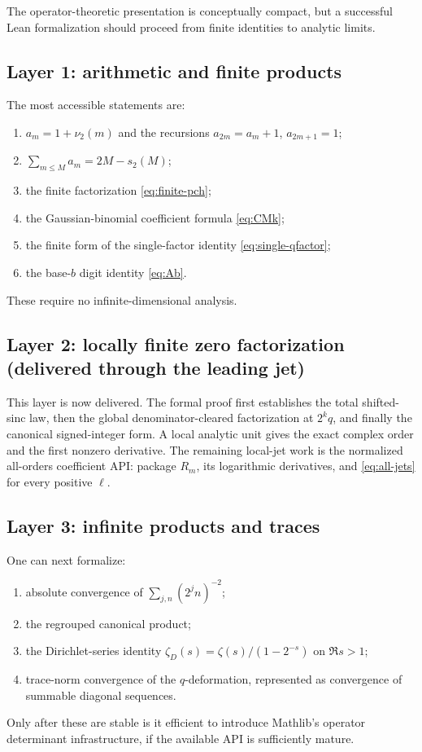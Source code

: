 \documentclass[11pt,oneside]{article}
\numberwithin{equation}{section}
\theoremstyle{plain}
\theoremstyle{definition}
\theoremstyle{remark}
\begin{document}
The operator-theoretic presentation is conceptually compact, but a successful Lean formalization should proceed from finite identities to analytic limits.

\subsection{Layer 1: arithmetic and finite products}

The most accessible statements are:
\begin{enumerate}[leftmargin=2em]
\item $a_m=1+\nu_2(m)$ and the recursions $a_{2m}=a_m+1$, $a_{2m+1}=1$;
\item $\sum_{m\le M}a_m=2M-s_2(M)$;
\item the finite factorization \cref{eq:finite-pch};
\item the Gaussian-binomial coefficient formula \cref{eq:CMk};
\item the finite form of the single-factor identity \cref{eq:single-qfactor};
\item the base-$b$ digit identity \cref{eq:Ab}.
\end{enumerate}
These require no infinite-dimensional analysis.

\subsection{Layer 2: locally finite zero factorization (delivered through the leading jet)}

This layer is now delivered.  The formal proof first establishes the total
shifted-sinc law, then the global denominator-cleared factorization at
\(2^kq\), and finally the canonical signed-integer form.  A local analytic
unit gives the exact complex order and the first nonzero derivative.  The
remaining local-jet work is the normalized all-orders coefficient API:
package \(R_m\), its logarithmic derivatives, and
\cref{eq:all-jets} for every positive \(\ell\).

\subsection{Layer 3: infinite products and traces}

One can next formalize:
\begin{enumerate}[leftmargin=2em]
\item absolute convergence of $\sum_{j,n}(2^jn)^{-2}$;
\item the regrouped canonical product;
\item the Dirichlet-series identity $\zeta_D(s)=\zeta(s)/(1-2^{-s})$ on $\Re s>1$;
\item trace-norm convergence of the $q$-deformation, represented as convergence of summable diagonal sequences.
\end{enumerate}
Only after these are stable is it efficient to introduce Mathlib's operator determinant infrastructure, if the available API is sufficiently mature.
\end{document}
